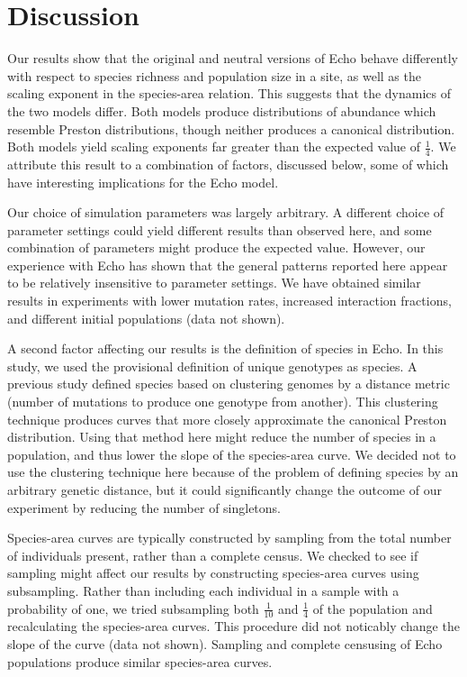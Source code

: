 \section{Discussion}

Our results show that the original and neutral versions of Echo behave
differently with respect to species richness and population size
in a site, as well as the scaling exponent in the species-area 
relation.  This suggests that the dynamics of the two models differ.
Both models produce distributions of abundance which resemble Preston
distributions, though neither produces a canonical distribution.
Both models yield scaling exponents far greater than the expected
value of $\frac{1}{4}$.  We attribute this result to a combination of factors,
discussed below, some of which have interesting implications for the
Echo model.

Our choice of simulation parameters was largely arbitrary.
A different choice of parameter settings could yield different results
than observed here, and some combination of parameters might produce
the expected value.  However, our experience with Echo has shown that
the general patterns reported here appear to be relatively insensitive to
parameter settings.  We have obtained similar results in experiments
with lower mutation rates, increased interaction fractions, and
different initial populations (data not shown).

A second factor affecting our results is the definition of
species in Echo.  In this study, we used the provisional definition
of unique genotypes as species.  A previous study
\cite{ForrestAndJones94} defined species based on 
clustering genomes by a distance metric (number of mutations to
produce one genotype from another).  This clustering technique
produces curves that more closely approximate the canonical Preston
distribution.  Using that method here might reduce the number of
species in a population, and thus lower the slope of the
species-area curve.  We decided not to use the clustering technique
here because of the problem of defining species by an arbitrary
genetic distance, but it could significantly change the outcome of our
experiment by reducing the number of singletons.

Species-area curves are typically constructed by sampling from the
total number of individuals present, rather than a complete census.
We checked to see if sampling might affect our results by constructing
species-area curves using subsampling.  Rather than including each
individual in a sample with a probability of one, we tried
subsampling both $\frac{1}{10}$ and $\frac{1}{4}$ of the population and
recalculating the species-area curves.  This procedure did not
noticably change the slope of the curve (data not shown).  Sampling
and complete censusing of Echo populations produce similar
species-area curves.

